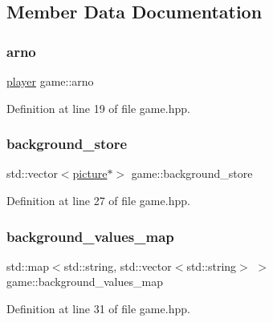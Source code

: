 \subsection{Member Data Documentation}
\mbox{\label{classgame_abea612890f55555c354cb24bd521b784}} 
\subsubsection{\texorpdfstring{arno}{arno}}
{\footnotesize\ttfamily \hyperlink{classplayer}{player} game\+::arno\hspace{0.3cm}{\ttfamily [private]}}



Definition at line 19 of file game.\+hpp.

\mbox{\label{classgame_ad39555b6aeb922c481a4f37500280d96}} 
\subsubsection{\texorpdfstring{background\+\_\+store}{background\_store}}
{\footnotesize\ttfamily std\+::vector$<$\hyperlink{classpicture}{picture}$\ast$$>$ game\+::background\+\_\+store\hspace{0.3cm}{\ttfamily [private]}}



Definition at line 27 of file game.\+hpp.

\mbox{\label{classgame_a839db13cc77624fa6a671b46bbf02b28}} 
\subsubsection{\texorpdfstring{background\+\_\+values\+\_\+map}{background\_values\_map}}
{\footnotesize\ttfamily std\+::map$<$std\+::string, std\+::vector$<$std\+::string$>$ $>$ game\+::background\+\_\+values\+\_\+map\hspace{0.3cm}{\ttfamily [private]}}



Definition at line 31 of file game.\+hpp.

